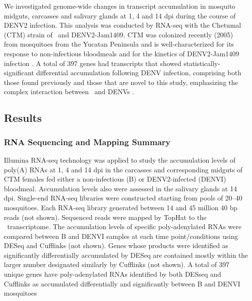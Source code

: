 We investigated genome-wide changes in transcript accumulation in mosquito midguts, carcasses and salivary glands at 1, 4 and 14 \gls{dpi} during the course of \gls{DENV}2 infection.
This analysis was conducted by RNA-seq with the Chetumal (CTM) strain of \Aa\ and \gls{DENV}2-Jam1409.
\gls{CTM} was colonized recently (2005) from mosquitoes from the Yucatan Peninsula and is well-characterized for its response to non-infectious bloodmeals and for the kinetics of \gls{DENV}2-Jam1409 infection \cite{Salazar2007,Bernhardt2012,bonizzoni2012strain}.
A total of 397 genes had transcripts that showed statistically-significant differential accumulation following \gls{DENV} infection, comprising both those found previously and those that are novel to this study, emphasizing the complex interaction between \Aa\ and \gls{DENV}s \cite{Xi2008,Sim2010,Tchankouo-Nguetcheu2010,Luplertlop2011,Behura2011,Sim2012,Colpitts2011}.




\subsection{Results}
\subsubsection{RNA Sequencing and Mapping Summary}

Illumina RNA-seq technology was applied to study the accumulation levels of poly(A) RNAs at 1, 4 and 14 \gls{dpi} in the carcasses and corresponding midguts of \gls{CTM} females fed either a non-infectious (B) or \gls{DENV}2-infected (\gls{DENVI}) bloodmeal.
Accumulation levels also were assessed in the salivary glands at 14 \gls{dpi}.
Single-end RNA-seq libraries were constructed starting from pools of 20–40 mosquitoes.
Each RNA-seq library generated between 14 and 45 million 40 bp reads (not shown).
Sequenced reads were mapped by TopHat \cite{Trapnell2009} to the \Aa\ transcriptome.
The accumulation levels of specific poly-adenylated RNAs were compared between B and \gls{DENVI} samples at each time point/conditions using DESeq \cite{Anders2010} and Cufflinks \cite{Trapnell2010} (not shown).
Genes whose products were identified as significantly differentially accumulated by DESeq are contained mostly within the larger number designated similarly by Cufflinks (not shown). A total of 397 unique genes have poly-adenylated RNAs identified by both DESseq and Cufflinks as accumulated differentially and significantly between B and \gls{DENVI} mosquitoes

